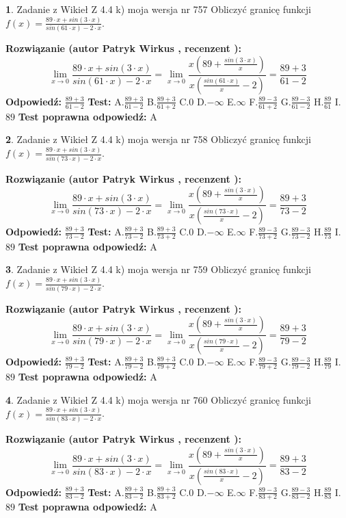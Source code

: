 \documentclass[12pt, a4paper]{article}
\theoremstyle{definition} %
\newtheorem{zad}{}
\newcommand{\zadStart}[1]{\begin{zad}#1\newline}
\newcommand{\zadStop}{\end{zad}}
\newcommand{\rozwStart}[2]{\noindent \textbf{Rozwiązanie (autor #1 , recenzent #2): }\newline}
\newcommand{\rozwStop}{\newline}
\newcommand{\odpStart}{\noindent \textbf{Odpowiedź:}\newline}
\newcommand{\odpStop}{\newline}
\newcommand{\testStart}{\noindent \textbf{Test:}\newline}
\newcommand{\testStop}{\newline}
\newcommand{\kluczStart}{\noindent \textbf{Test poprawna odpowiedź:}\newline}
\newcommand{\kluczStop}{\newline}
\begin{document}
\zadStart{Zadanie z Wikieł Z 4.4 k) moja wersja nr 757}
Obliczyć granicę funkcji $f(x)=\frac{89\cdot x +sin(3\cdot x)}{sin(61\cdot x) -2\cdot x}$.
\zadStop
\rozwStart{Patryk Wirkus}{}
$$\lim\limits_{x\to 0}\frac{89\cdot x +sin(3\cdot x)}{sin(61\cdot x) -2\cdot x}
=\lim\limits_{x\to 0}\frac{x(89+\frac{sin(3\cdot x)}{x})}{x(\frac{sin(61\cdot x)}{x}-2)}
=\frac{89+3}{61-2}$$
\rozwStop
\odpStart
$\frac{89+3}{61-2}$
\odpStop
\testStart
A.$\frac{89+3}{61-2}$
B.$\frac{89+3}{61+2}$
C.$0$
D.$-\infty$
E.$\infty$
F.$\frac{89-3}{61+2}$
G.$\frac{89-3}{61-2}$
H.$\frac{89}{61}$
I.$89$
\testStop
\kluczStart
A
\kluczStop



\zadStart{Zadanie z Wikieł Z 4.4 k) moja wersja nr 758}
Obliczyć granicę funkcji $f(x)=\frac{89\cdot x +sin(3\cdot x)}{sin(73\cdot x) -2\cdot x}$.
\zadStop
\rozwStart{Patryk Wirkus}{}
$$\lim\limits_{x\to 0}\frac{89\cdot x +sin(3\cdot x)}{sin(73\cdot x) -2\cdot x}
=\lim\limits_{x\to 0}\frac{x(89+\frac{sin(3\cdot x)}{x})}{x(\frac{sin(73\cdot x)}{x}-2)}
=\frac{89+3}{73-2}$$
\rozwStop
\odpStart
$\frac{89+3}{73-2}$
\odpStop
\testStart
A.$\frac{89+3}{73-2}$
B.$\frac{89+3}{73+2}$
C.$0$
D.$-\infty$
E.$\infty$
F.$\frac{89-3}{73+2}$
G.$\frac{89-3}{73-2}$
H.$\frac{89}{73}$
I.$89$
\testStop
\kluczStart
A
\kluczStop



\zadStart{Zadanie z Wikieł Z 4.4 k) moja wersja nr 759}
Obliczyć granicę funkcji $f(x)=\frac{89\cdot x +sin(3\cdot x)}{sin(79\cdot x) -2\cdot x}$.
\zadStop
\rozwStart{Patryk Wirkus}{}
$$\lim\limits_{x\to 0}\frac{89\cdot x +sin(3\cdot x)}{sin(79\cdot x) -2\cdot x}
=\lim\limits_{x\to 0}\frac{x(89+\frac{sin(3\cdot x)}{x})}{x(\frac{sin(79\cdot x)}{x}-2)}
=\frac{89+3}{79-2}$$
\rozwStop
\odpStart
$\frac{89+3}{79-2}$
\odpStop
\testStart
A.$\frac{89+3}{79-2}$
B.$\frac{89+3}{79+2}$
C.$0$
D.$-\infty$
E.$\infty$
F.$\frac{89-3}{79+2}$
G.$\frac{89-3}{79-2}$
H.$\frac{89}{79}$
I.$89$
\testStop
\kluczStart
A
\kluczStop



\zadStart{Zadanie z Wikieł Z 4.4 k) moja wersja nr 760}
Obliczyć granicę funkcji $f(x)=\frac{89\cdot x +sin(3\cdot x)}{sin(83\cdot x) -2\cdot x}$.
\zadStop
\rozwStart{Patryk Wirkus}{}
$$\lim\limits_{x\to 0}\frac{89\cdot x +sin(3\cdot x)}{sin(83\cdot x) -2\cdot x}
=\lim\limits_{x\to 0}\frac{x(89+\frac{sin(3\cdot x)}{x})}{x(\frac{sin(83\cdot x)}{x}-2)}
=\frac{89+3}{83-2}$$
\rozwStop
\odpStart
$\frac{89+3}{83-2}$
\odpStop
\testStart
A.$\frac{89+3}{83-2}$
B.$\frac{89+3}{83+2}$
C.$0$
D.$-\infty$
E.$\infty$
F.$\frac{89-3}{83+2}$
G.$\frac{89-3}{83-2}$
H.$\frac{89}{83}$
I.$89$
\testStop
\kluczStart
A
\kluczStop
\end{document}
